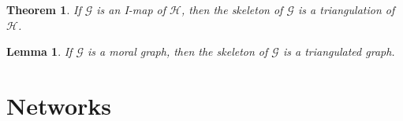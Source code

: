 \documentclass[11pt]{article}
\numberwithin{equation}{section}
\theoremstyle{boldStyle}
\theoremstyle{boldBlueStyle}
\newtheorem{lemma}{Lemma}[section]
\theoremstyle{boldPurpleStyle}
\newtheorem{theorem}{Theorem}[section]
\theoremstyle{boldRedStyle}
\begin{document}
\begin{theorem}
    If $\mathcal{G}$ is an I-map of $\mathcal{H}$, then the skeleton of $\mathcal{G}$ is a triangulation of $\mathcal{H}$.
\end{theorem}

\begin{lemma}
    If $\mathcal{G}$ is a moral graph, then the skeleton of $\mathcal{G}$ is a triangulated graph.
\end{lemma}







\newpage
\section{Networks}
\end{document}
